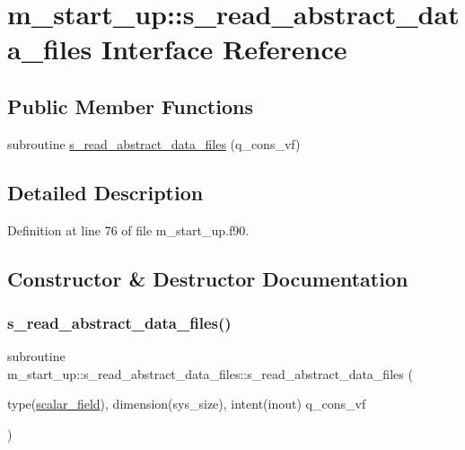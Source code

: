 \hypertarget{interfacem__start__up_1_1s__read__abstract__data__files}{}\section{m\+\_\+start\+\_\+up\+:\+:s\+\_\+read\+\_\+abstract\+\_\+data\+\_\+files Interface Reference}
\label{interfacem__start__up_1_1s__read__abstract__data__files}
\subsection*{Public Member Functions}
\begin{DoxyCompactItemize}
\item 
subroutine \hyperlink{interfacem__start__up_1_1s__read__abstract__data__files_a7305fb27dae05a7b1f6c19f22098edf0}{s\+\_\+read\+\_\+abstract\+\_\+data\+\_\+files} (q\+\_\+cons\+\_\+vf)
\end{DoxyCompactItemize}


\subsection{Detailed Description}


Definition at line 76 of file m\+\_\+start\+\_\+up.\+f90.



\subsection{Constructor \& Destructor Documentation}
\mbox{\label{interfacem__start__up_1_1s__read__abstract__data__files_a7305fb27dae05a7b1f6c19f22098edf0}} 
\subsubsection{\texorpdfstring{s\+\_\+read\+\_\+abstract\+\_\+data\+\_\+files()}{s\_read\_abstract\_data\_files()}}
{\footnotesize\ttfamily subroutine m\+\_\+start\+\_\+up\+::s\+\_\+read\+\_\+abstract\+\_\+data\+\_\+files\+::s\+\_\+read\+\_\+abstract\+\_\+data\+\_\+files (\begin{DoxyParamCaption}\item[{type(\hyperlink{structm__derived__types_1_1scalar__field}{scalar\+\_\+field}), dimension(sys\+\_\+size), intent(inout)}]{q\+\_\+cons\+\_\+vf }\end{DoxyParamCaption})}



